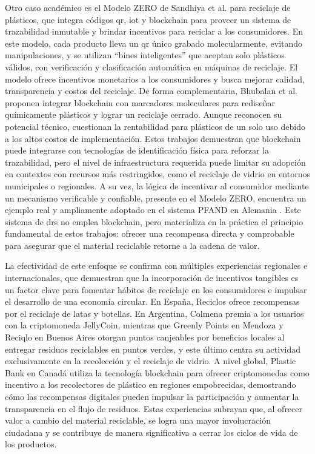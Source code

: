 Otro caso académico es el Modelo ZERO de Sandhiya et al. \cite{sandhiya2020investigating} para reciclaje de plásticos, que integra códigos \acrshort{qr}, \acrshort{iot} y blockchain para proveer un sistema de trazabilidad inmutable y brindar incentivos para reciclar a los consumidores. En este modelo, cada producto lleva un \acrshort{qr} único grabado molecularmente, evitando manipulaciones, y se utilizan ``bines inteligentes'' que aceptan solo plásticos válidos, con verificación y clasificación automática en máquinas de reciclaje. El modelo ofrece incentivos monetarios a los consumidores y busca mejorar calidad, transparencia y costos del reciclaje. De forma complementaria, Bhubalan et al. \cite{BHUBALAN2022113631} proponen integrar blockchain con marcadores moleculares para rediseñar químicamente plásticos y lograr un reciclaje cerrado. Aunque reconocen su potencial técnico, cuestionan la rentabilidad para plásticos de un solo uso debido a los altos costos de implementación. Estos trabajos demuestran que blockchain puede integrarse con tecnologías de identificación física para reforzar la trazabilidad, pero el nivel de infraestructura requerida puede limitar su adopción en contextos con recursos más restringidos, como el reciclaje de vidrio en entornos municipales o regionales. A su vez, la lógica de incentivar al consumidor mediante un mecanismo verificable y confiable, presente en el Modelo ZERO, encuentra un ejemplo real y ampliamente adoptado en el sistema PFAND en Alemania \cite{pending}. Este sistema de \acrfull{drs} no emplea blockchain, pero materializa en la práctica el principio fundamental de estos trabajos: ofrecer una recompensa directa y comprobable para asegurar que el material reciclable retorne a la cadena de valor.

La efectividad de este enfoque se confirma con múltiples experiencias regionales e internacionales, que demuestran que la incorporación de incentivos tangibles es un factor clave para fomentar hábitos de reciclaje en los consumidores e impulsar el desarrollo de una economía circular. En España, Reciclos \cite{reciclos2024} ofrece recompensas por el reciclaje de latas y botellas. En Argentina, Colmena \cite{colmena2024} premia a los usuarios con la criptomoneda JellyCoin, mientras que Greenly Points \cite{greenlypoints2024} en Mendoza y Reciqlo en Buenos Aires \cite{innovar2024vidrio} otorgan puntos canjeables por beneficios locales al entregar residuos reciclables en puntos verdes, y este último centra su actividad exclusivamente en la recolección y el reciclaje de vidrio. A nivel global, Plastic Bank en Canadá utiliza la tecnología blockchain para ofrecer criptomonedas como incentivo a los recolectores de plástico en regiones empobrecidas, demostrando cómo las recompensas digitales pueden impulsar la participación y aumentar la transparencia en el flujo de residuos. Estas experiencias subrayan que, al ofrecer valor a cambio del material reciclable, se logra una mayor involucración ciudadana y se contribuye de manera significativa a cerrar los ciclos de vida de los productos.

